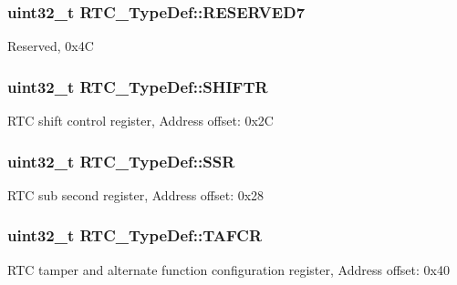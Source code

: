 \subsubsection[{\texorpdfstring{R\+E\+S\+E\+R\+V\+E\+D7}{RESERVED7}}]{\setlength{\rightskip}{0pt plus 5cm}uint32\+\_\+t R\+T\+C\+\_\+\+Type\+Def\+::\+R\+E\+S\+E\+R\+V\+E\+D7}\hypertarget{struct_r_t_c___type_def_a09936292ef8d82974b55a03a1080534e}{}\label{struct_r_t_c___type_def_a09936292ef8d82974b55a03a1080534e}
Reserved, 0x4C 
\subsubsection[{\texorpdfstring{S\+H\+I\+F\+TR}{SHIFTR}}]{ uint32\+\_\+t R\+T\+C\+\_\+\+Type\+Def\+::\+S\+H\+I\+F\+TR}\hypertarget{struct_r_t_c___type_def_a6082856c9191f5003b6163c0d3afcaff}{}\label{struct_r_t_c___type_def_a6082856c9191f5003b6163c0d3afcaff}
R\+TC shift control register, Address offset\+: 0x2C 
\subsubsection[{\texorpdfstring{S\+SR}{SSR}}]{ uint32\+\_\+t R\+T\+C\+\_\+\+Type\+Def\+::\+S\+SR}\hypertarget{struct_r_t_c___type_def_aefbd38be87117d1fced289bf9c534414}{}\label{struct_r_t_c___type_def_aefbd38be87117d1fced289bf9c534414}
R\+TC sub second register, Address offset\+: 0x28 
\subsubsection[{\texorpdfstring{T\+A\+F\+CR}{TAFCR}}]{ uint32\+\_\+t R\+T\+C\+\_\+\+Type\+Def\+::\+T\+A\+F\+CR}\hypertarget{struct_r_t_c___type_def_a498ecce9715c916dd09134fddd0072c0}{}\label{struct_r_t_c___type_def_a498ecce9715c916dd09134fddd0072c0}
R\+TC tamper and alternate function configuration register, Address offset\+: 0x40 
